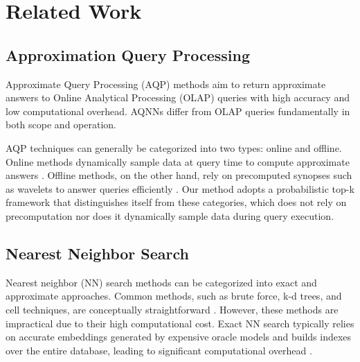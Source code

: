 \section{Related Work}\label{sec:relwork}
\subsection{Approximation Query Processing}

Approximate Query Processing (AQP) methods aim to return approximate answers to Online Analytical Processing (OLAP) queries with high accuracy and low computational overhead. AQNNs differ from OLAP queries fundamentally in both scope and operation. 

AQP techniques can generally be categorized into two types: online and offline. Online methods dynamically sample data at query time to compute approximate answers \cite{DBLP:conf/eurosys/AgarwalMPMMS13}. Offline methods, on the other hand, rely on precomputed synopses such as wavelets to answer queries efficiently \cite{DBLP:conf/vldb/ChakrabartiGRS00}. Our method adopts a probabilistic top-k framework that distinguishes itself from these categories, which does not rely on precomputation nor does it dynamically sample data during query execution. 

\subsection{Nearest Neighbor Search}
Nearest neighbor (NN) search methods can be categorized into exact and approximate approaches. Common methods, such as brute force, k-d trees, and cell techniques, are conceptually straightforward \cite{DBLP:journals/toms/FriedmanBF77, FRNNSurvey}. However, these methods are impractical due to their high computational cost. Exact NN search typically relies on accurate embeddings generated by expensive oracle models and builds indexes over the entire database, leading to significant computational overhead \cite{DBLP:conf/sigmod/LiZAH20}. 

